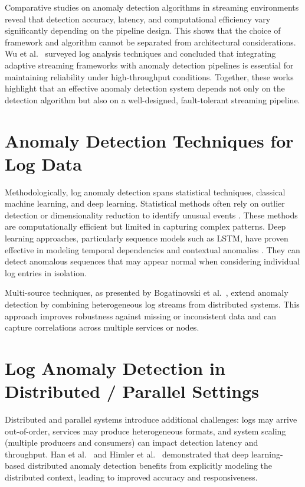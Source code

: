 \documentclass[12pt,a4paper]{report}
\begin{document}
Comparative studies on anomaly detection algorithms in streaming environments \cite{Hasani2020} reveal that detection accuracy, latency, and computational efficiency vary significantly depending on the pipeline design. This shows that the choice of framework and algorithm cannot be separated from architectural considerations. Wu et al.\ \cite{Wu2021} surveyed log analysis techniques and concluded that integrating adaptive streaming frameworks with anomaly detection pipelines is essential for maintaining reliability under high-throughput conditions. Together, these works highlight that an effective anomaly detection system depends not only on the detection algorithm but also on a well-designed, fault-tolerant streaming pipeline.

\section{Anomaly Detection Techniques for Log Data}
Methodologically, log anomaly detection spans statistical techniques, classical machine learning, and deep learning. Statistical methods often rely on outlier detection or dimensionality reduction to identify unusual events \cite{Fu2009}. These methods are computationally efficient but limited in capturing complex patterns. Deep learning approaches, particularly sequence models such as LSTM, have proven effective in modeling temporal dependencies and contextual anomalies \cite{Du2017, Sun2021}. They can detect anomalous sequences that may appear normal when considering individual log entries in isolation.

Multi-source techniques, as presented by Bogatinovski et al.\ \cite{Bogatinovski2021}, extend anomaly detection by combining heterogeneous log streams from distributed systems. This approach improves robustness against missing or inconsistent data and can capture correlations across multiple services or nodes.

\section{Log Anomaly Detection in Distributed / Parallel Settings}
Distributed and parallel systems introduce additional challenges: logs may arrive out-of-order, services may produce heterogeneous formats, and system scaling (multiple producers and consumers) can impact detection latency and throughput. Han et al.\ \cite{Han2023} and Himler et al.\ \cite{Himler2024} demonstrated that deep learning-based distributed anomaly detection benefits from explicitly modeling the distributed context, leading to improved accuracy and responsiveness.
\end{document}
